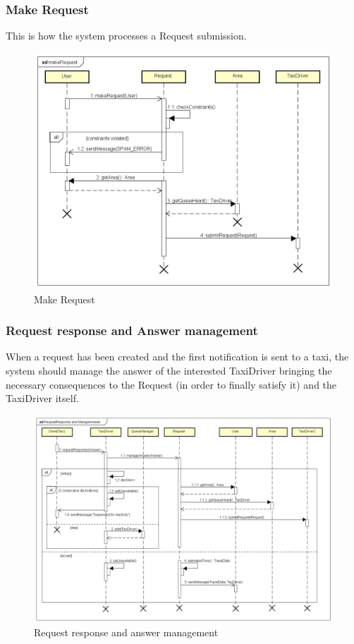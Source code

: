 		\subsubsection{Make Request}
		This is how the system processes a Request submission.
		\begin{figure}[h!]
			\begin{center}
				\includegraphics[width=1\linewidth]{../SE2_SD/makeRequest}
				\caption{Make Request}
				\label{fig:makeRequest}
			\end{center}
		\end{figure}
		\clearpage
		\subsubsection{Request response and Answer management}
		When a request has been created and the first notification is sent to a taxi, the system should
		manage the answer of the interested TaxiDriver bringing the necessary consequences to the Request
		(in order to finally satisfy it) and the TaxiDriver itself.
		\begin{figure}[h!]
			\begin{center}
				\includegraphics[width=1\linewidth]{../SE2_SD/RequestResponseManageAnswer}
				\caption{Request response and answer management}
			\end{center}
		\end{figure}
		\clearpage
